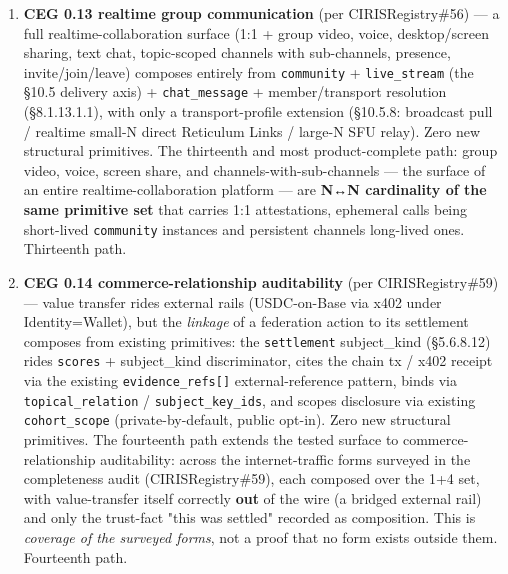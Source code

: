 \documentclass[10pt]{article}
\begin{document}
\begin{enumerate}
\item \textbf{CEG 0.13 realtime group communication} (per CIRISRegistry\#56) — a full realtime-collaboration surface (1:1 + group video, voice, desktop/screen sharing, text chat, topic-scoped channels with sub-channels, presence, invite/join/leave) composes entirely from \texttt{community} + \texttt{live\_stream} (the §10.5 delivery axis) + \texttt{chat\_message} + member/transport resolution (§8.1.13.1.1), with only a transport-profile extension (§10.5.8: broadcast pull / realtime small-N direct Reticulum Links / large-N SFU relay). Zero new structural primitives. The thirteenth and most product-complete path: group video, voice, screen share, and channels-with-sub-channels — the surface of an entire realtime-collaboration platform — are \textbf{N↔N cardinality of the same primitive set} that carries 1:1 attestations, ephemeral calls being short-lived \texttt{community} instances and persistent channels long-lived ones. Thirteenth path.
\item \textbf{CEG 0.14 commerce-relationship auditability} (per CIRISRegistry\#59) — value transfer rides external rails (USDC-on-Base via x402 under Identity=Wallet), but the \textit{linkage} of a federation action to its settlement composes from existing primitives: the \texttt{settlement} subject\_kind (§5.6.8.12) rides \texttt{scores} + subject\_kind discriminator, cites the chain tx / x402 receipt via the existing \texttt{evidence\_refs[]} external-reference pattern, binds via \texttt{topical\_relation} / \texttt{subject\_key\_ids}, and scopes disclosure via existing \texttt{cohort\_scope} (private-by-default, public opt-in). Zero new structural primitives. The fourteenth path extends the tested surface to commerce-relationship auditability: across the internet-traffic forms surveyed in the completeness audit (CIRISRegistry\#59), each composed over the 1+4 set, with value-transfer itself correctly \textbf{out} of the wire (a bridged external rail) and only the trust-fact "this was settled" recorded as composition. This is \textit{coverage of the surveyed forms}, not a proof that no form exists outside them. Fourteenth path.

\end{enumerate}
\end{document}
